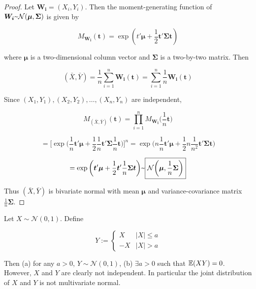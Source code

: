 \begin{proof}

Let \(\boldsymbol{W_i} = (X_i, Y_i)\). Then the moment-generating function of \(\boldsymbol{W_i} \textapprox \mathcal{N}(\boldsymbol{\mu}, \boldsymbol{\Sigma})\) is given by

\[
M_{\boldsymbol{W_i}}(\boldsymbol{t}) = \exp(t' \boldsymbol{\mu} + \frac{1}{2} \boldsymbol{t}' \boldsymbol{\Sigma} \boldsymbol{t})
\]

where \(\boldsymbol{\mu}\) is a two-dimensional column vector and \( \boldsymbol{\Sigma}\) is a two-by-two matrix. Then

\[
(\bar{X}, \bar{Y}) = \frac{1}{n} \sum_{i=1}^n \boldsymbol{W_i}(\boldsymbol{t}) =  \sum_{i=1}^n \frac{1}{n} \boldsymbol{W_i}(\boldsymbol{t})
\]

Since \((X_1, Y_1), (X_2, Y_2), \ldots ,(X_n, Y_n)\) are independent,

\[
M_{(\bar{X}, \bar{Y})}(\boldsymbol{t}) = \prod_{i=1}^n M_{\boldsymbol{W_i}}\bigg(\frac{1}{n} \boldsymbol{t} \bigg)
\]

\[
= \bigg[ \exp\bigg(\frac{1}{n} \boldsymbol{t}' \boldsymbol{\mu} + \frac{1}{2} \frac{1}{n} \boldsymbol{t}' \boldsymbol{\Sigma} \frac{1}{n}  \boldsymbol{t} \bigg) \bigg]^n =  \exp\bigg(n \frac{1}{n} \boldsymbol{t}' \boldsymbol{\mu} + \frac{1}{2} n \frac{1}{n^2} \boldsymbol{t}' \boldsymbol{\Sigma} \boldsymbol{t} \bigg) 
\]

\[
=  \exp\bigg( \boldsymbol{t}' \boldsymbol{\mu} + \frac{1}{2} \boldsymbol{t}' \frac{1}{n}  \boldsymbol{\Sigma} \boldsymbol{t} \bigg) \textapprox \boxed{\mathcal{N}\bigg(\boldsymbol{\mu}, \frac{1}{n}\boldsymbol{\Sigma}\bigg)}
\]

Thus \((\bar{X}, \bar{Y})\) is bivariate normal with mean \(\boldsymbol{\mu}\) and variance-covariance matrix \(\frac{1}{n}\boldsymbol{\Sigma}\).


\end{proof}

\begin{example}

Let \(X \sim \mathcal{N}(0,1)\). Define

\[
Y:= \begin{cases}
X & |X| \leq a \\
-X & |X| > a
\end{cases}
\]

Then (a) for any \(a > 0\), \(Y \sim \mathcal{N}(0,1)\), (b) \(\exists a > 0\) such that \(\mathbb{E}(XY) = 0\). However, \(X\) and \(Y\) are clearly not independent. In particular the joint distribution of \(X \) and \(Y\) is not multivariate normal.

\end{example}

